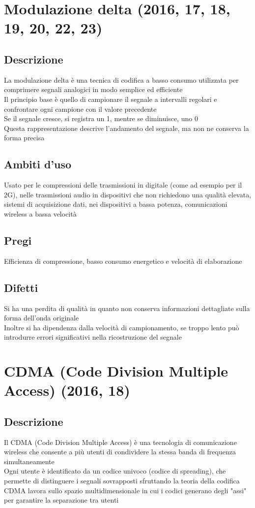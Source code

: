 \documentclass[10pt,oneside,a4paper]{article}
\begin{document}
\section{Modulazione delta (2016, 17, 18, 19, 20, 22, 23)}
\subsection{Descrizione}
La modulazione delta è una tecnica di codifica a basso consumo utilizzata per comprimere segnali analogici in modo semplice ed efficiente\\
Il principio base è quello di campionare il segnale a intervalli regolari e confrontare ogni campione con il valore precedente\\
Se il segnale cresce, si registra un 1, mentre se diminuisce, uno 0\\
Questa rappresentazione descrive l'andamento del segnale, ma non ne conserva la forma precisa
\subsection{Ambiti d'uso}
Usato per le compressioni delle trasmissioni in digitale (come ad esempio per il 2G), nelle trasmissioni audio in dispositivi che non richiedono una qualità elevata, sistemi di acquisizione dati, nei dispositivi a bassa potenza, comunicazioni wireless a bassa velocità
\subsection{Pregi}
Efficienza di compressione, basso consumo energetico e velocità di elaborazione
\subsection{Difetti}
Si ha una perdita di qualità in quanto non conserva informazioni dettagliate sulla forma dell'onda originale\\
Inoltre si ha dipendenza dalla velocità di campionamento, se troppo lento può introdurre errori significativi nella ricostruzione del segnale
\section{CDMA (Code Division Multiple Access) (2016, 18)}
\subsection{Descrizione}
Il CDMA (Code Division Multiple Access) è una tecnologia di comunicazione wireless che consente a più utenti di condividere la stessa banda di frequenza simultaneamente\\
Ogni utente è identificato da un codice univoco (codice di spreading), che permette di distinguere i segnali sovrapposti sfruttando la teoria della codifica\\
CDMA lavora sullo spazio multidimensionale in cui i codici generano degli "assi" per garantire la separazione tra utenti
\end{document}
